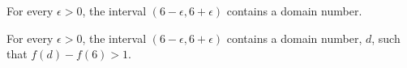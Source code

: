 \documentclass{ximera}
\begin{document}
\begin{exercise}
\begin{question}
\end{question}














\begin{question} 


For every $\epsilon > 0$, the interval $(6-\epsilon, 6+\epsilon)$ contains a domain number.
\begin{multipleChoice}
\end{multipleChoice}





For every $\epsilon > 0$, the interval $(6-\epsilon, 6+\epsilon)$ contains a domain number, $d$, such that $f(d) - f(6) > 1$.
\begin{multipleChoice}
\end{multipleChoice}


\end{question}














\end{exercise}
\end{document}
